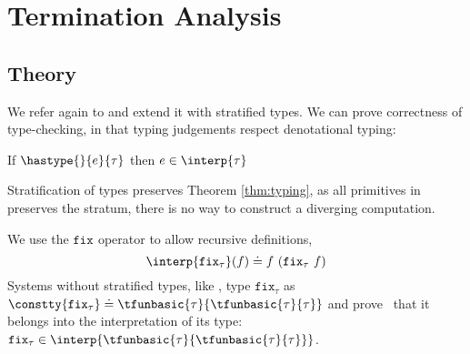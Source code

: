 \newcommand\fixtype[1]{\ensuremath{
	\tfunbasic{#1}{
	\tfunbasic{#1}{
	#1
}}}}
\newcommand\ediverge{\ensuremath{\mathtt{diverge}}\xspace}
\newcommand\efib{\ensuremath{\mathtt{fib}}\xspace}
\newcommand\efix[1]{\ensuremath{\mathtt{fix}_{#1}}\xspace}
\newcommand\efixn[2]{\ensuremath{\mathtt{fix}_{#1}^{#2}}\xspace}
\newcommand\adecrty[2]{\ensuremath{	
	\tfun{n'}{\tref{n'}{\tint}{\lfinite}{v < #2}}{#1\sub{x}{n'}}
}}
\newcommand\decrty[1]{\ensuremath{	
	\tfun{n}{\tint^\lfinite}{
			\tfunbasic{(\adecrty{#1}{n})}
			{#1\sub{x}{n}}
			}
}}
\newcommand\etfix[1]{\ensuremath{\mathtt{fix}_{\lfinite, #1}}\xspace}
\newcommand\etfixf[3]{\ensuremath{\mathtt{fix}^{#2}_{\lfinite, #1}}\xspace}
\newcommand\etfixfn[3]{\ensuremath{\mathtt{fix}^{#3, #2}_{\lfinite, #1}}\xspace}
\newcommand\etfixn[3]{\ensuremath{\mathtt{fix}^{#3}_{\lfinite, #1}}\xspace}
\newcommand\etfixnty[3]{\ensuremath{}}
\newcommand\etfixfty[3]{\ensuremath{
\begin{array}{l}
	\tfun{m}{\tint^\lfinite}{#1\sub{x}{m}}	
\end{array}
}}
\newcommand\etfixty[2]{\ensuremath{
\begin{array}{l}
	(\decrty{#1})\\
	\rightarrow
	\tfun{m}{\tint^\lfinite}{#1\sub{x}{m}}	
\end{array}
}}
\section{Termination Analysis}\label{sec:termination}
\subsection{Theory}

We refer again to \undeclang 
and extend it with stratified types.
%
We can prove correctness of type-checking, in that 
typing judgements respect denotational typing:
%
\begin{theorem}\label{thm:typing}
If $\hastype{}{e}{\tau}$ then $e \in \interp{\tau}$
\end{theorem} 
%
Stratification of types preserves Theorem \ref{thm:typing}, 
as all primitives in \undeclang preserves the stratum, 
\ie there is no way to construct a diverging computation.
%

We use the \efix{} operator to allow recursive definitions,
%
$$\interp{\efix{\tau}}(f) \doteq f\ (\efix{\tau}\ f) $$
%
Systems without stratified types, like \hlang,
type \efix{\tau} as
$\constty{\efix{\tau}}\doteq{\fixtype{\tau}}$
and prove~\citep{} that it belongs
into the interpretation of its type:
$\efix{\tau} \in \interp{\fixtype{\tau}}$.

